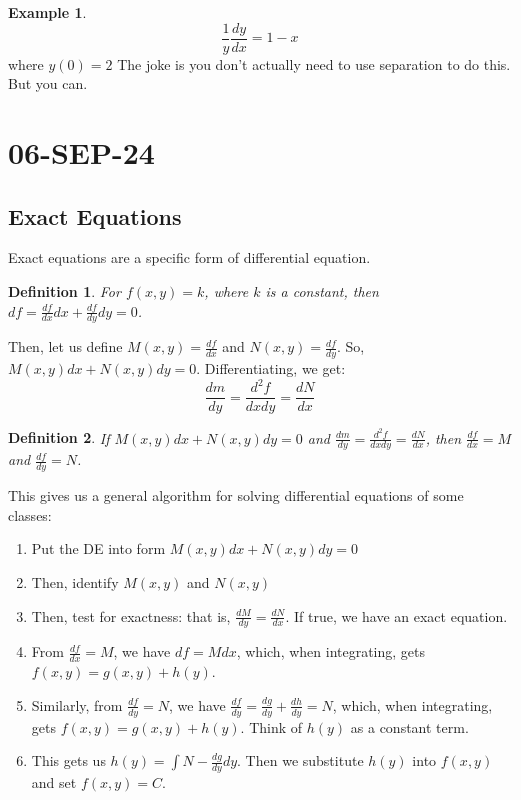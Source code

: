 \documentclass[10pt, oneside]{article}
\newtheorem{defn}{Definition}
\theoremstyle{definition}
\newtheorem{example}{Example}[section]
\begin{document}
\begin{example}
    \[\frac{1}{y}\frac{dy}{dx} = 1-x\]
    where $y(0) = 2$
The joke is you don't actually need to use separation to do this. But you can. 
\end{example}

\section{06-SEP-24}
\subsection{Exact Equations}
Exact equations are a specific form of differential equation. 
\begin{defn}
For $f(x,y) = k$, where $k$ is a constant, then $df = \frac{df}{dx}dx + \frac{df}{dy}dy = 0$.
\end{defn}

Then, let us define $M(x,y) = \frac{df}{dx}$ and $N(x,y) = \frac{df}{dy}$. So, $M(x,y)dx + N(x,y)dy = 0$. 
Differentiating, we get:
\[\frac{dm}{dy} = \frac{d^2f}{dxdy} = \frac{dN}{dx}\]

\begin{defn}
If $M(x,y)dx + N(x,y)dy = 0$ and $\frac{dm}{dy} = \frac{d^2f}{dxdy} = \frac{dN}{dx}$, then $\frac{df}{dx} = M$ and $\frac{df}{dy} = N$.
\end{defn}

This gives us a general algorithm for solving differential equations of some classes: 
\begin{enumerate}
    \item Put the DE into form $M(x,y)dx + N(x,y)dy = 0$
    \item Then, identify $M(x,y)$ and $N(x,y)$
    \item Then, test for exactness: that is, $\frac{dM}{dy} = \frac{dN}{dx}$. If true, we have an exact equation. 
    \item From $\frac{df}{dx} = M$, we have $df = M dx$, which, when integrating, gets $f(x,y) = g(x,y) + h(y)$.
    \item Similarly, from $\frac{df}{dy} = N$, we have $\frac{df}{dy} = \frac{dg}{dy} + \frac{dh}{dy} = N$, which, when integrating, gets $f(x,y) = g(x,y) + h(y)$. Think of $h(y)$ as a constant term.
    \item This gets us $h(y) = \int{N - \frac{dg}{dy}}dy$. Then we substitute $h(y)$ into $f(x,y)$ and set $f(x,y) = C$.
\end{enumerate}
\end{document}
